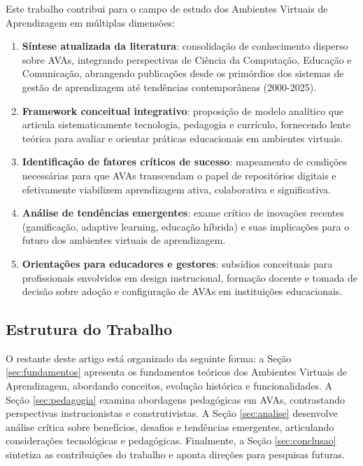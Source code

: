 \documentclass[portuguese]{sbc2025}%
\begin{document}
Este trabalho contribui para o campo de estudo dos Ambientes Virtuais de Aprendizagem em múltiplas dimensões:

\begin{enumerate}
    \item \textbf{Síntese atualizada da literatura}: consolidação de conhecimento disperso sobre AVAs, integrando perspectivas de Ciência da Computação, Educação e Comunicação, abrangendo publicações desde os primórdios dos sistemas de gestão de aprendizagem até tendências contemporâneas (2000-2025).
    \item \textbf{Framework conceitual integrativo}: proposição de modelo analítico que articula sistematicamente tecnologia, pedagogia e currículo, fornecendo lente teórica para avaliar e orientar práticas educacionais em ambientes virtuais.
    \item \textbf{Identificação de fatores críticos de sucesso}: mapeamento de condições necessárias para que AVAs transcendam o papel de repositórios digitais e efetivamente viabilizem aprendizagem ativa, colaborativa e significativa.
    \item \textbf{Análise de tendências emergentes}: exame crítico de inovações recentes (gamificação, adaptive learning, educação híbrida) e suas implicações para o futuro dos ambientes virtuais de aprendizagem.
    \item \textbf{Orientações para educadores e gestores}: subsídios conceituais para profissionais envolvidos em design instrucional, formação docente e tomada de decisão sobre adoção e configuração de AVAs em instituições educacionais.
\end{enumerate}

\subsection{Estrutura do Trabalho}

O restante deste artigo está organizado da seguinte forma: a Seção \ref{sec:fundamentos} apresenta os fundamentos teóricos dos Ambientes Virtuais de Aprendizagem, abordando conceitos, evolução histórica e funcionalidades. A Seção \ref{sec:pedagogia} examina abordagens pedagógicas em AVAs, contrastando perspectivas instrucionistas e construtivistas. A Seção \ref{sec:analise} desenvolve análise crítica sobre benefícios, desafios e tendências emergentes, articulando considerações tecnológicas e pedagógicas. Finalmente, a Seção \ref{sec:conclusao} sintetiza as contribuições do trabalho e aponta direções para pesquisas futuras.
\end{document}
